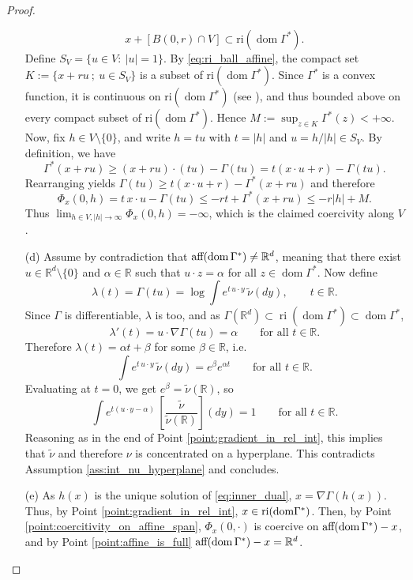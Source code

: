 \documentclass[reqno, a4paper]{amsart}
\DeclareMathOperator{\ri}{ri}
\theoremstyle{plain}
\theoremstyle{definition}
\theoremstyle{remark}
\numberwithin{equation}{section}
\numberwithin{theorem}{section}
\newcommand{\R}{\mathbb{R}}
\newcommand{\aff}{\textnormal{aff}}
\newcommand{\dom}{\operatorname{dom}}
\begin{document}
\begin{proof}
\begin{enumerate}
\begin{equation}
				x+ [B(0,r)\cap V] \subset \mathrm{ri}(\dom\Gamma^*).
			\end{equation}
			Define $S_V=\{u\in V:\ |u|=1\}.$
			By \eqref{eq:ri_ball_affine}, the compact set $K :=\{x+ru~;~ u\in S_V\}$ is a subset of $\mathrm{ri}(\dom\Gamma^*)$. Since $\Gamma^*$ is a convex function, it is continuous on $\mathrm{ri}(\dom\Gamma^*)$ (see \cite[Remark 3.1.3]{HiLe93}), and thus bounded above on every
			compact subset of $\mathrm{ri}(\dom\Gamma^*)$. Hence $
			M:=\sup_{z\in K}\Gamma^*(z)< +\infty$. Now, fix $h\in V \setminus\{0\}$, and write $h=t u$ with $t=|h|$ and $u=h/|h|\in S_V$.	By definition, we have
			\[
			\Gamma^*(x+ru)\ge (x+ru)\cdot(tu)-\Gamma(tu)=t(x\cdot u+r)-\Gamma(tu).
			\]
			Rearranging yields
			$
			\Gamma(tu)\ge t(x\cdot u+r)-\Gamma^*(x+ru)
			$ 
			and therefore
			\[
			\Phi_x(0,h)=t\,x\cdot u-\Gamma(tu)\le -rt+\Gamma^*(x+ru)\le -r|h|+M.
			\]
			Thus $\lim_{h \in V, |h | \to \infty} \Phi_x(0,h) = -\infty$, which is the
			claimed coercivity along $V$.
			\item[(d)] Assume by contradiction that $\aff(\dom \Gamma^*)\neq \R^d$, meaning that there exist
			$u\in \R^d\setminus\{0\}$ and $\alpha\in\R$ such that
			$u\cdot z=\alpha$ for all  $z\in \dom \Gamma^*.$ Now define
			\[
			\lambda(t)=\Gamma(tu)=\log \int e^{t\,u\cdot y}\,\tilde\nu(dy), \qquad t \in \R.
			\]
			Since \(\Gamma\) is differentiable, \(\lambda\) is too, and as $\Gamma(\R^d) \subset \ri(\dom \Gamma^*) \subset \dom \Gamma^*$,
			\[
			\lambda'(t)=u\cdot \nabla\Gamma(tu)=\alpha \qquad \text{for all } t\in\R.
			\]
			Therefore \(\lambda(t)=\alpha t+\beta\) for some \(\beta\in\R\), i.e.
			\[
			\int e^{t\,u\cdot y}\,\tilde\nu(dy)=e^\beta e^{\alpha t}\qquad \text{for all } t\in\R.
			\]
			Evaluating at \(t=0\), we get \(e^\beta= \tilde \nu(\R) \), so
			\[
			\int e^{t(u\cdot y-\alpha)}\,\left[\frac{\tilde \nu}{\tilde \nu(\R)}\right](dy)= 1\qquad \text{for all } t\in\R.
			\]
			Reasoning as in the end of Point \ref{point:gradient_in_rel_int}, this implies that $\tilde \nu$ and therefore $\nu$ is concentrated on a hyperplane. This contradicts Assumption \ref{ass:int_nu_hyperplane} and concludes.
			\item[(e)] As $h(x)$ is the unique solution of \eqref{eq:inner_dual}, $x = \nabla \Gamma (h(x))$. Thus, by Point \ref{point:gradient_in_rel_int}, $x \in \textnormal{ri}(\textnormal{dom} \Gamma^*)$. Then, by Point \ref{point:coercitivity_on_affine_span}, $\Phi_x(0,\cdot)$ is coercive on $\aff(\dom\Gamma^*)-x$, and by Point \ref{point:affine_is_full} $\aff(\dom\Gamma^*)-x = \R^d$. 
		\end{enumerate}
		

\end{proof}
\end{document}
